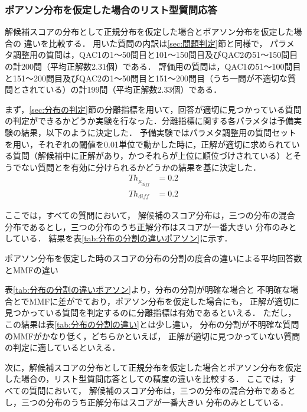 \documentclass[japanese]{jnlp_1.4}
\begin{document}
\subsubsection{ポアソン分布を仮定した場合のリスト型質問応答}\label{subsec:ポアソンでの精度}

解候補スコアの分布として正規分布を仮定した場合とポアソン分布を仮定した場合の
違いを比較する．
用いた質問の内訳は\ref{sec:問題判定}節と同様で，
パラメタ調整用の質問は，QAC1の1〜50問目と101〜150問目及びQAC2の51〜150問目の計200問（平均正解数2.31個）である．
評価用の質問は，QAC1の51〜100問目と151〜200問目及びQAC2の1〜50問目と151〜200問目（うち一問が不適切な質問とされている）の計199問（平均正解数2.33個）である．

まず，\ref{sec:分布の判定}節の分離指標を用いて，回答が適切に見つかっている質問の判定ができるかどうか実験を行なった．分離指標に関する各パラメタは予備実験の結果，以下のように決定した．
予備実験ではパラメタ調整用の質問セットを用い，それぞれの閾値を0.01単位で動かした時に，正解が適切に求められている質問（解候補中に正解があり，かつそれらが上位に順位づけされている）とそうでない質問とを有効に分けられるかどうかの結果を基に決定した．
\begin{align}
Th_{\mu_{\mathit{diff}}} & = 0.2 \\
Th_{\mathit{diff}} & = 0.2
\end{align}

ここでは，すべての質問において，
解候補のスコア分布は，三つの分布の混合分布であるとし，三つの分布のうち正解分布はスコアが一番大きい
分布のみとしている．
結果を表\ref{tab:分布の分割の違いポアソン}に示す．

\begin{table}[b]
\caption{ポアソン分布を仮定した時のスコアの分布の分割の度合の違いによる平均回答数とMMFの違い}
\label{tab:分布の分割の違いポアソン}
\begin{center}

\end{center}
\end{table}

表\ref{tab:分布の分割の違いポアソン}より，分布の分割が明確な場合と
不明確な場合とでMMFに差がでており，ポアソン分布を仮定した場合にも，
正解が適切に見つかっている質問を判定するのに分離指標は有効であるといえる．
ただし，この結果は表\ref{tab:分布の分割の違い}とは少し違い，
分布の分割が不明確な質問のMMFがかなり低く，どちらかといえば，
正解が適切に見つかっていない質問の判定に適しているといえる．

次に，解候補スコアの分布として正規分布を仮定した場合とポアソン分布を仮定した場合の，リスト型質問応答としての精度の違いを比較する．
ここでは，すべての質問において，
解候補のスコア分布は，三つの分布の混合分布であるとし，三つの分布のうち正解分布はスコアが一番大きい
分布のみとしている．
\end{document}
